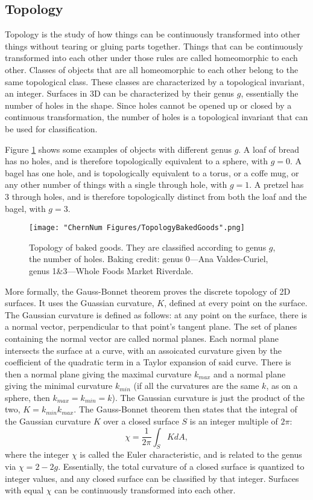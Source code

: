 \subsection{Topology}
Topology is the study of how things can be continuously transformed into other things without tearing or gluing parts together. Things that can be continuously transformed into each other under those rules are called homeomorphic to each other. Classes of objects that are all homeomorphic to each other belong to the same topological class. These classes are characterized by a topological invariant, an integer. Surfaces in 3D can be characterized by their genus $g$, essentially the number of holes in the shape. Since holes cannot be opened up or closed by a continuous transformation, the number of holes is a topological invariant that can be used for classification. 

Figure \ref{fig:bakedGoods} shows some examples of objects with different genus $g$. A loaf of bread has no holes, and is therefore topologically equivalent to a sphere, with $g=0$. A bagel has one hole, and is topologically equivalent to a torus, or a coffe mug, or any other number of things with a single through hole, with $g=1$. A pretzel has $3$ through holes, and is therefore topologically distinct from both the loaf and the bagel, with $g=3$. 
\begin{figure}
	\texttt{[image: "ChernNum Figures/TopologyBakedGoods".png]}
\label{fig:bakedGoods}
\caption[Topology of baked goods]{Topology of baked goods. They are classified according to genus $g$, the number of holes. Baking credit: genus 0---Ana Valdes-Curiel, genus 1\&3---Whole Foods Market Riverdale. }
\end{figure}

More formally, the Gauss-Bonnet theorem proves the discrete topology of 2D surfaces. It uses the Guassian curvature, $K$, defined at every point on the surface. The Gaussian curvature is defined as follows\cite{Grinfeld2014}: at any point on the surface, there is a normal vector, perpendicular to that point's tangent plane. The set of planes containing the normal vector are called normal planes. Each normal plane intersects the surface at a curve, with an assoicated curvature given by the coefficient of the quadratic term in a Taylor expansion of said curve. There is then a normal plane giving the maximal curvature $k_{max}$ and a normal plane giving the minimal curvature $k_{min}$ (if all the curvatures are the same $k$, as on a sphere, then $k_{max}=k_{min}=k$). The Gaussian curvature is just the product of the two, $K=k_{min}k_{max}$. The Gauss-Bonnet theorem\cite{Grinfeld2014} then states that the integral of the Gaussian curvature $K$ over a closed surface $S$ is an integer multiple of $2\pi$:
\begin{equation}
\chi = \frac{1}{2\pi}\int_S K dA,
\label{eqn:GaussBonnet}
\end{equation}
where the integer $\chi$ is called the Euler characteristic, and is related to the genus via $\chi = 2 - 2g$. Essentially, the total curvature of a closed surface is quantized to integer values, and any closed surface can be classified by that integer. Surfaces with equal $\chi$ can be continuously transformed into each other.

